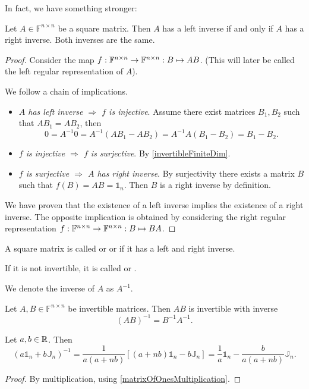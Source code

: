 In fact, we have something stronger:
\begin{lemma}
Let $A\in \mathbb{F}^{n\times n}$ be a square matrix. Then $A$ has a left inverse \textup{if and only if} $A$ has a right inverse. Both inverses are the same.
\end{lemma}
\begin{proof}
Consider the map $f:\mathbb{F}^{n\times n}\to \mathbb{F}^{n\times n}: B\mapsto AB$. (This will later be called the left regular representation of $A$). 
 
We follow a chain of implications.
\begin{itemize}
\item \textit{$A$ has left inverse $\Rightarrow$ $f$ is injective}. Assume there exist matrices $B_1,B_2$ such that $AB_1 = AB_2$, then
\[ 0 = A^{-1}0 = A^{-1}(AB_1-AB_2) = A^{-1}A(B_1-B_2) = B_1-B_2. \]
\item \textit{$f$ is injective $\Rightarrow$ $f$ is surjective}. By \ref{invertibleFiniteDim}.
\item \textit{$f$ is surjective $\Rightarrow$ $A$ has right inverse}. By surjectivity there exists a matrix $B$ such that $f(B) = AB=\mathbb{1}_n$. Then $B$ is a right inverse by definition.
\end{itemize}
We have proven that the existence of a left inverse implies the existence of a right inverse. The opposite implication is obtained by considering the right regular representation $f:\mathbb{F}^{n\times n}\to \mathbb{F}^{n\times n}: B\mapsto BA$.
\end{proof}
\begin{definition}
A square matrix is called  or  or  if it has a left and right inverse.

If it is not invertible, it is called  or .

We denote the inverse of $A$ as $A^{-1}$.
\end{definition}
\begin{lemma}
Let $A,B\in \mathbb{F}^{n\times n}$ be invertible matrices. Then $AB$ is invertible with inverse
\[ (AB)^{-1} = B^{-1}A^{-1}. \]
\end{lemma}

\begin{lemma}
Let $a,b\in\mathbb{R}$. Then
\[ (a\mathbb{1}_n +b\mathbb{J}_n)^{-1} = \frac{1}{a(a+nb)}[(a+nb)\mathbb{1}_n -b\mathbb{J}_n] = \frac{1}{a}\mathbb{1}_n - \frac{b}{a(a+nb)}\mathbb{J}_n. \]
\end{lemma}
\begin{proof}
By multiplication, using \ref{matrixOfOnesMultiplication}.
\end{proof}

